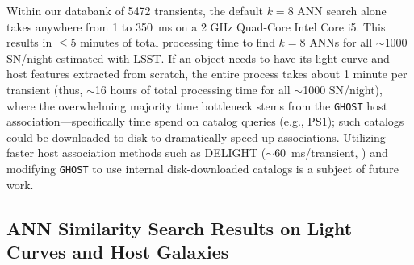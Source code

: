 \documentclass[twocolumn]{aastex63}
\begin{document}
Within our databank of 5472 transients, the default $k=8$ ANN search alone takes anywhere from 1 to 350~ms on a 2 GHz Quad-Core Intel Core i5. This results in $\leq$5 minutes of total processing time to find $k=8$ ANNs for all $\sim$1000 SN/night estimated with LSST. If an object needs to have its light curve and host features extracted from scratch, the entire process takes about 1 minute per transient (thus, $\sim$16 hours of total processing time for all $\sim$1000 SN/night), where the overwhelming majority time bottleneck stems from the \texttt{GHOST} host association---specifically time spend on catalog queries (e.g., PS1); such catalogs could be downloaded to disk to dramatically speed up associations. Utilizing faster host association methods such as DELIGHT ($\sim$60~ms/transient, \citealt{Forster2022}) and modifying \texttt{GHOST} to use internal disk-downloaded catalogs is a subject of future work. \par

\subsection{ANN Similarity Search Results on Light Curves and Host Galaxies} \label{subsec:sim_search_ztf}
\end{document}

